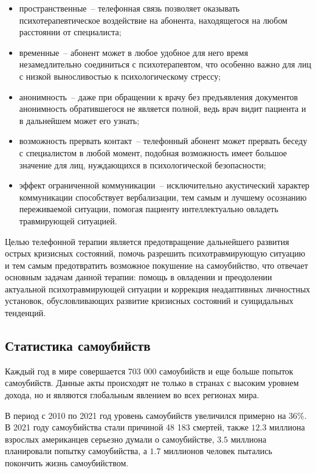 \begin{itemize}
	\item пространственные~-- телефонная связь позволяет оказывать психотерапевтическое воздействие на абонента, находящегося на любом расстоянии от специалиста;
	\item временные~-- абонент может в любое удобное для него время незамедлительно соединиться с психотерапевтом, что особенно важно для лиц с низкой выносливостью к психологическому стрессу;
	\item анонимность~-- даже при обращении к врачу без предъявления документов анонимность обратившегося не является полной, ведь врач видит пациента и в дальнейшем может его узнать;
	\item возможность прервать контакт~-- телефонный абонент может прервать беседу с специалистом в любой момент, подобная возможность имеет большое значение для лиц, нуждающихся в психологической безопасности;
	\item эффект ограниченной коммуникации~-- исключительно акустический характер коммуникации способствует вербализации, тем самым и лучшему осознанию переживаемой ситуации, помогая пациенту интеллектуально овладеть травмирующей ситуацией.
\end{itemize}

Целью телефонной терапии является предотвращение дальнейшего развития острых кризисных состояний, помочь разрешить психотравмирующую ситуацию и тем самым предотвратить возможное покушение на самоубийство, что отвечает основным задачам данной терапии: помощь в овладении и преодолении актуальной психотравмирующей ситуации и коррекция неадаптивных личностных установок, обусловливающих развитие кризисных состояний и суицидальных тенденций.

\subsection{Статистика самоубийств}
Каждый год в мире совершается 703 000 самоубийств и еще больше попыток самоубийств. Данные акты происходят не только в странах с высоким уровнем дохода, но и являются глобальным явлением во всех регионах мира.~\cite{suicideVOZDouble}

В период с 2010 по 2021 год уровень самоубийств увеличился примерно на $36\%$. В 2021 году самоубийства стали причиной 48 183 смертей, также $12.3$ миллиона взрослых американцев серьезно думали о самоубийстве, $3.5$ миллиона планировали попытку самоубийства, а $1.7$ миллионов человек пытались покончить жизнь самоубийством.~\cite{suicideStats}

